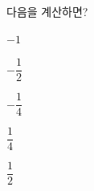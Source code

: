 다음을 계산하면?
\begin{choices32}{\rule[-3ex]{0pt}{8ex}$-1$}{\rule[-3ex]{0pt}{8ex}$-\dfrac{1}{2}$}{\rule[-3ex]{0pt}{8ex}$-\dfrac{1}{4}$}{\rule[-3ex]{0pt}{8ex}$\dfrac{1}{4}$}{\rule[-3ex]{0pt}{8ex}$\dfrac{1}{2}$}\end{choices32}
